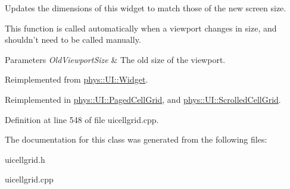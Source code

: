 Updates the dimensions of this widget to match those of the new screen size. 

This function is called automatically when a viewport changes in size, and shouldn't need to be called manually. 
\begin{DoxyParams}{Parameters}
{\em OldViewportSize} & The old size of the viewport. \\
\hline
\end{DoxyParams}


Reimplemented from \hyperlink{classphys_1_1UI_1_1Widget_acbda7003549c6caac46078c034657929}{phys::UI::Widget}.



Reimplemented in \hyperlink{classphys_1_1UI_1_1PagedCellGrid_a7d6ddd7126f86d2ea6592ac3f9a91037}{phys::UI::PagedCellGrid}, and \hyperlink{classphys_1_1UI_1_1ScrolledCellGrid_aed1f61cbdab04c555e26076ec933bbf2}{phys::UI::ScrolledCellGrid}.



Definition at line 548 of file uicellgrid.cpp.



The documentation for this class was generated from the following files:\begin{DoxyCompactItemize}
\item 
uicellgrid.h\item 
uicellgrid.cpp\end{DoxyCompactItemize}

